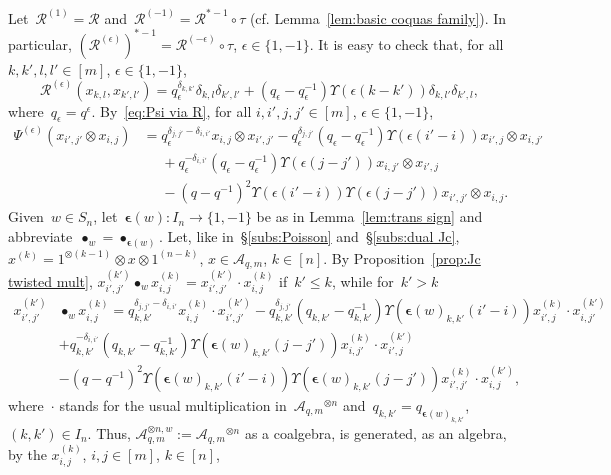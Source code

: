\documentclass[12pt, reqno]{amsart}
\theoremstyle{definition}
\numberwithin{equation}{section}
\newcommand{\tensor}{\otimes}
\newcommand{\sgna}[1]{\boldsymbol{\epsilon}(#1)}
\begin{document}
Let~$\mathcal R^{(1)}=\mathcal R$ and~$\mathcal R^{(-1)}=
\mathcal R^{\ast-1}\circ\tau$ (cf. Lemma~\ref{lem:basic coquas family}). In particular,
$(\mathcal R^{(\epsilon)})^{\ast-1}=\mathcal R^{(-\epsilon)}\circ\tau$, $\epsilon\in\{1,-1\}$.
It is easy to check 
that, for all $k,k',l,l'\in [m]$, $\epsilon\in\{1,-1\}$,
$$
\mathcal R^{(\epsilon)}(x_{k,l},x_{k',l'})=q_\epsilon^{\delta_{k,k'}}\delta_{k,l}\delta_{k',l'}+(q_\epsilon-q_\epsilon^{-1})\Upsilon(\epsilon(k-k'))\delta_{k,l'}\delta_{k',l},
$$
where~$q_\epsilon=q^{\epsilon}$. 
By~\eqref{eq:Psi via R}, for all
$i,i',j,j'\in[m]$, $\epsilon\in\{1,-1\}$,
\begin{align*}
\Psi^{(\epsilon)}(x_{i',j'}\tensor x_{i,j})&=
q_\epsilon^{\delta_{j,j'}-\delta_{i,i'}}x_{i,j}\tensor x_{i',j'}
-q_\epsilon^{\delta_{j,j'}}(q_\epsilon-q_\epsilon^{-1})\Upsilon(\epsilon(i'-i))x_{i',j}\tensor x_{i,j'}\\
&\phantom{=}+q_\epsilon^{-\delta_{i,i'}}(q_\epsilon-q_\epsilon^{-1})
\Upsilon(\epsilon(j-j'))x_{i,j'}\tensor x_{i',j}\\
&\phantom{=}
-(q-q^{-1})^2\Upsilon(\epsilon(i'-i))\Upsilon(\epsilon(j-j'))x_{i',j'}\tensor x_{i,j}.
\end{align*}
Given~$w\in S_n$, let~$\sgna{w}:I_n\to\{1,-1\}$ be as in Lemma~\ref{lem:trans sign} and
abbreviate~$\bullet_w=\bullet_{\sgna{w}}$.
Let, like in~\S\ref{subs:Poisson} and~\S\ref{subs:dual Jc}, $x^{(k)}=1^{\tensor (k-1)}\tensor x\tensor 1^{(n-k)}$, $x\in\mathcal A_{q,m}$, $k\in[n]$.
By Proposition~\ref{prop:Jc twisted mult},
$x_{i',j'}^{(k')}\bullet_w x_{i,j}^{(k)}=
x_{i',j'}^{(k')}\cdot x_{i,j}^{(k)}$ if~$k'\le k$, while 
for~$k'>k$
\begin{align*}
x_{i',j'}^{(k')}&\bullet_w x_{i,j}^{(k)}
=q_{k,k'}^{\delta_{j,j'}-\delta_{i,i'}}x_{i,j}^{(k)}\cdot x_{i',j'}^{(k')}
-q_{k,k'}^{\delta_{j,j'}}(q_{k,k'}-q_{k,k'}^{-1})\Upsilon(\sgna{w}_{k,k'}(i'-i))x_{i',j}^{(k)}\cdot x_{i,j'}^{(k')}\\
&+q_{k,k'}^{-\delta_{i,i'}}(q_{k,k'}-q_{k,k'}^{-1})
\Upsilon(\sgna{w}_{k,k'}(j-j'))x_{i,j'}^{(k)}\cdot x_{i',j}^{(k')}\\
&-(q-q^{-1})^2\Upsilon(\sgna{w}_{k,k'}(i'-i))
\Upsilon(\sgna{w}_{k,k'}(j-j'))x_{i',j'}^{(k)}\cdot x_{i,j}^{(k')},
\end{align*}
where~$\cdot$ stands for the usual multiplication in~$\mathcal A_{q,m}{}^{\tensor n}$ and~$q_{k,k'}=q_{\sgna{w}_{k,k'}}$, $(k,k')\in I_n$.
Thus,
$\mathcal A_{q,m}^{\tensor n,w}:=\mathcal A_{q,m}{}^{\tensor n}$ as a coalgebra, is generated, as an algebra, by the $x_{i,j}^{(k)}$, $i,j\in[m]$, $k\in[n]$,
\end{document}
